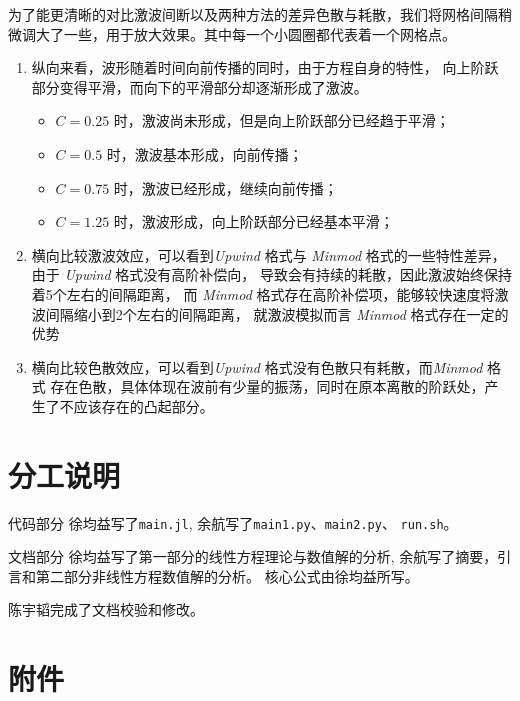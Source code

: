 \documentclass[10.5pt
]{article}
\begin{document}
为了能更清晰的对比激波间断以及两种方法的差异色散与耗散，我们将网格间隔稍微调大了一些，用于放大效果。其中每一个小圆圈都代表着一个网格点。
\begin{enumerate}
\item
    纵向来看，波形随着时间向前传播的同时，由于方程自身的特性，
    向上阶跃部分变得平滑，而向下的平滑部分却逐渐形成了激波。
\begin{itemize}
	\item $C = 0.25$ 时，激波尚未形成，但是向上阶跃部分已经趋于平滑；
	\item $C = 0.5$  时，激波基本形成，向前传播；
	\item $C = 0.75$ 时，激波已经形成，继续向前传播；
	\item $C = 1.25$ 时，激波形成，向上阶跃部分已经基本平滑；
\end{itemize}

\item
    横向比较激波效应，可以看到\textit{Upwind} 格式与 \textit{Minmod} 格式的一些特性差异，由于 \textit{Upwind} 格式没有高阶补偿向，
    导致会有持续的耗散，因此激波始终保持着5个左右的间隔距离，
    而 \textit{Minmod} 格式存在高阶补偿项，能够较快速度将激波间隔缩小到2个左右的间隔距离，
    就激波模拟而言 \textit{Minmod} 格式存在一定的优势
\item
    横向比较色散效应，可以看到\textit{Upwind} 格式没有色散只有耗散，而\textit{Minmod} 格式
    存在色散，具体体现在波前有少量的振荡，同时在原本离散的阶跃处，产生了不应该存在的凸起部分。
\end{enumerate}

\section{分工说明}

代码部分
徐均益写了\verb|main.jl|, 
余航写了\verb|main1.py|、\verb|main2.py|、 \verb|run.sh|。

文档部分
徐均益写了第一部分的线性方程理论与数值解的分析, 余航写了摘要，引言和第二部分非线性方程数值解的分析。
核心公式由徐均益所写。

陈宇韬完成了文档校验和修改。
\section{附件}
\end{document}

